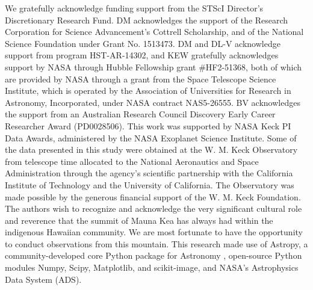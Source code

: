 \documentclass[preprint2]{aastex6}
\begin{document}


% 





%
%

\acknowledgements

\noindent We gratefully acknowledge funding support from the STScI Director's Discretionary Research Fund. DM acknowledges the support of the Research Corporation for Science Advancement's Cottrell Scholarship, and of the National Science Foundation under Grant No. 1513473. DM and DL-V acknowledge support from program HST-AR-14302, and KEW gratefully acknowledges support by NASA through Hubble Fellowship grant \#HF2-51368, both of which are provided by NASA through a grant from the Space Telescope Science Institute, which is operated by the Association of Universities for Research in Astronomy, Incorporated, under NASA contract NAS5-26555. BV acknowledges the support from an Australian Research Council Discovery Early Career Researcher Award (PD0028506).  This work was supported by NASA Keck PI Data Awards, administered by the NASA Exoplanet Science Institute. Some of the data presented in this study were obtained at the W. M. Keck Observatory from telescope time allocated to the National Aeronautics and Space Administration through the agency's scientific partnership with the California Institute of Technology and the University of California. The Observatory was made possible by the generous financial support of the W. M. Keck Foundation. The authors wish to recognize and acknowledge the very significant cultural role and reverence that the summit of Mauna Kea has always had within the indigenous Hawaiian community. We are most fortunate to have the opportunity to conduct observations from this mountain. This research made use of Astropy, a community-developed core Python package for Astronomy \citep{astropy}, open-source Python modules Numpy, Scipy, Matplotlib, and scikit-image, and NASA's Astrophysics Data System (ADS).  \\
\end{document}
